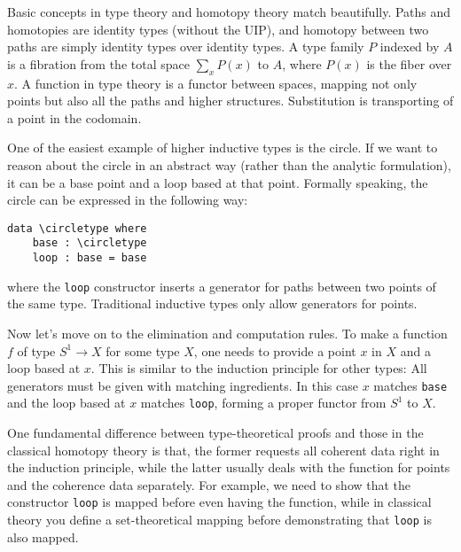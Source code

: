\documentclass{article}
\begin{document}
Basic concepts in type theory and homotopy theory match beautifully.
Paths and homotopies are identity types (without the UIP),
and homotopy between two paths are simply identity types over identity types.
A type family $P$ indexed by $A$ is a fibration from the total space $\sum_x P(x)$ to $A$,
where $P(x)$ is the fiber over $x$.
A function in type theory is a functor between spaces,
mapping not only points but also all the paths and higher structures.
Substitution is transporting of a point in the codomain.

One of the easiest example of higher inductive types is the circle.
If we want to reason about the circle in an abstract way
(rather than the analytic formulation),
it can be a base point and a loop based at that point.
Formally speaking, the circle can be expressed in the following way:
\newcommand{\circletype}{\ensuremath{S^1}}
\begin{Verbatim}[commandchars=\\\{\}]
  data \circletype where
    base : \circletype
    loop : base = base
\end{Verbatim}
where the \texttt{loop} constructor inserts a generator for paths between
two points of the same type. Traditional inductive types
only allow generators for points.

Now let's move on to the elimination and computation rules.
To make a function $f$ of type $\circletype \to X$ for some type $X$,
one needs to provide a point $x$ in $X$ and a loop based at $x$.
This is similar to the induction principle for other types:
All generators must be given with matching ingredients.
In this case $x$ matches \texttt{base} and the loop based at $x$
matches \texttt{loop}, forming a proper functor from $\circletype$ to $X$.

One fundamental difference between type-theoretical proofs
and those in the classical homotopy theory is that, the former requests
all coherent data right in the induction principle, while the latter
usually deals with the function for points and the coherence data separately.
For example, we need to show that the constructor \texttt{loop}
is mapped before even having the function,
while in classical theory you define a set-theoretical mapping
before demonstrating that \texttt{loop} is also mapped.
\end{document}
